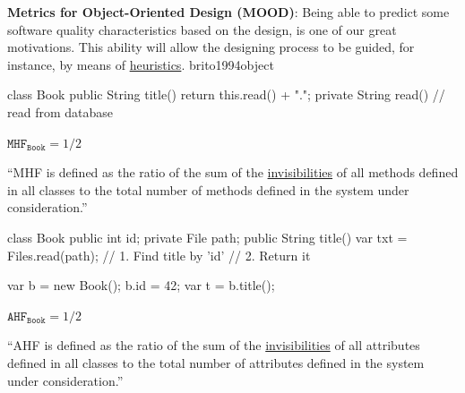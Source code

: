 \documentclass{article}
\begin{document}


  {\textbf{Metrics for Object-Oriented Design (MOOD)}: Being able to predict some software quality characteristics based on the design, is one of our great motivations. This ability will allow the designing process to be guided, for instance, by means of \ul{heuristics}.}
  {brito1994object}

\begin{multicols}{2}
{\small\begin{ffcode}
class Book {
  public String title() {
    return this.read() + ".";
  }
  private String read() {
    // read from database
  }
}
\end{ffcode}
}
\par\columnbreak\par
\(\texttt{MHF}_\texttt{Book} = 1/2\)\par
``MHF is defined as the ratio of the sum of the \ul{invisibilities} of all methods
defined in all classes to the total number of methods defined in the system
under consideration.''
\end{multicols}
\plush{}

\begin{multicols}{2}
{\small\begin{ffcode}
class Book {
  public int id;
  private File path;
  public String title() {
    var txt = Files.read(path);
    // 1. Find title by 'id'
    // 2. Return it
  }
}

var b = new Book();
b.id = 42;
var t = b.title();
\end{ffcode}
}
\par\columnbreak\par
\(\texttt{AHF}_\texttt{Book} = 1/2\)\par
``AHF is defined as the ratio of the sum of the \ul{invisibilities} of all attributes
defined in all classes to the total number of attributes defined in the system
under consideration.''
\end{multicols}
\plush{}
\end{document}
